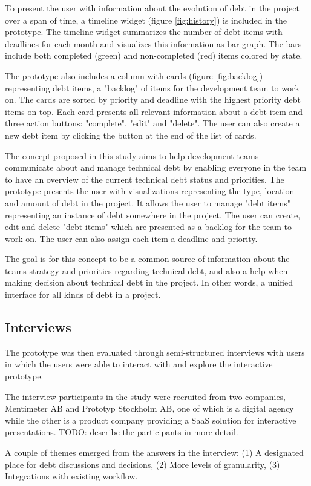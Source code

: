 To present the user with information about the evolution of debt in the project over a span of time, a timeline widget (figure \ref{fig:history}) is included in the prototype.
The timeline widget summarizes the number of debt items with deadlines for each month and visualizes this information as bar graph.
The bars include both completed (green) and non-completed (red) items colored by state.



The prototype also includes a column with cards (figure \ref{fig:backlog}) representing debt items, a "backlog" of items for the development team to work on.
The cards are sorted by priority and deadline with the highest priority debt items on top.
Each card presents all relevant information about a debt item and three action buttons: "complete", "edit" and "delete".
The user can also create a new debt item by clicking the button at the end of the list of cards.

The concept proposed in this study aims to help development teams communicate about and manage technical debt by enabling everyone in the team to have an overview of the current technical debt status and priorities.
The prototype presents the user with visualizations representing the type, location and amount of debt in the project.
It allows the user to manage "debt items" representing an instance of debt somewhere in the project.
The user can create, edit and delete "debt items" which are presented as a backlog for the team to work on.
The user can also assign each item a deadline and priority. 

The goal is for this concept to be a common source of information about the teams strategy and priorities regarding technical debt, and also a help when making decision about technical debt in the project.
In other words, a unified interface for all kinds of debt in a project.

\subsection{Interviews}

The prototype was then evaluated through semi-structured interviews with users in which the users were able to interact with and explore the interactive prototype.

The interview participants in the study were recruited from two companies, Mentimeter AB and Prototyp Stockholm AB, one of which is a digital agency while the other is a product company providing a SaaS solution for interactive presentations. TODO: describe the participants in more detail.

A couple of themes emerged from the answers in the interview: (1) A designated place for debt discussions and decisions, (2) More levels of granularity, (3) Integrations with existing workflow.